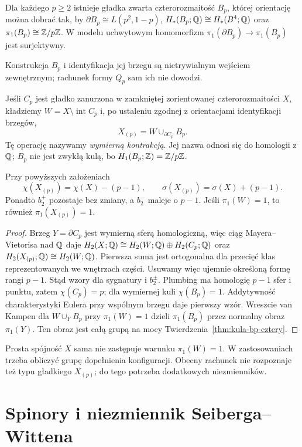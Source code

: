 \begin{twierdzenie}
\label{thm:kula-bp-cztery}
Dla każdego $p\geq2$ istnieje gładka zwarta
czterorozmaitość $B_p$, której orientację można
dobrać tak, by
$\partial B_p\cong L(p^2,1-p)$,
$H_*(B_p;\mathbb{Q})\cong H_*(B^4;\mathbb{Q})$ oraz
$\pi_1(B_p)\cong\mathbb{Z}/p\mathbb{Z}$.
W modelu uchwytowym homomorfizm
$\pi_1(\partial B_p)\to\pi_1(B_p)$ jest surjektywny.
\end{twierdzenie}
\noindent Konstrukcja $B_p$ i identyfikacja jej brzegu
są nietrywialnym wejściem zewnętrznym; rachunek formy
$Q_p$ sam ich nie dowodzi.

Jeśli $C_p$ jest gładko zanurzona w zamkniętej
zorientowanej czterorozmaitości $X$, kładziemy
$W=X\setminus\operatorname{int}C_p$ i, po ustaleniu
zgodnej z orientacjami identyfikacji brzegów,
\[
 X_{(p)}=W\cup_{\partial C_p}B_p.
\]
Tę operację nazywamy \emph{wymierną kontrakcją}.
Jej nazwa odnosi się do homologii z $\mathbb{Q}$;
$B_p$ nie jest zwykłą kulą, bo $H_1(B_p;\mathbb{Z})=\mathbb{Z}/p\mathbb{Z}$.

\begin{stwierdzenie}
\label{prop:kontrakcja-niezmienniki-cztery}
Przy powyższych założeniach
\[
 \chi(X_{(p)})=\chi(X)-(p-1),\qquad
 \sigma(X_{(p)})=\sigma(X)+(p-1).
\]
Ponadto $b_2^+$ pozostaje bez zmiany, a $b_2^-$
maleje o $p-1$. Jeśli $\pi_1(W)=1$, to również
$\pi_1(X_{(p)})=1$.
\end{stwierdzenie}
\begin{proof}
Brzeg $Y=\partial C_p$ jest wymierną sferą homologiczną,
więc ciąg Mayera--Vietorisa nad $\mathbb{Q}$ daje
$H_2(X;\mathbb{Q})\cong H_2(W;\mathbb{Q})\oplus H_2(C_p;\mathbb{Q})$
oraz $H_2(X_{(p)};\mathbb{Q})\cong H_2(W;\mathbb{Q})$.
Pierwsza suma jest ortogonalna dla przecięć klas
reprezentowanych we wnętrzach części. Usuwamy więc
ujemnie określoną formę rangi $p-1$.
Stąd wzory dla sygnatury i $b_2^\pm$.
Plumbing ma homologię $p-1$ sfer i punktu,
zatem $\chi(C_p)=p$; dla wymiernej kuli
$\chi(B_p)=1$. Addytywność charakterystyki Eulera
przy wspólnym brzegu daje pierwszy wzór.
Wreszcie van Kampen dla $W\cup_Y B_p$ przy
$\pi_1(W)=1$ dzieli $\pi_1(B_p)$ przez normalny
obraz $\pi_1(Y)$. Ten obraz jest całą grupą na mocy
Twierdzenia~\ref{thm:kula-bp-cztery}.
\end{proof}

Prosta spójność $X$ sama nie zastępuje warunku
$\pi_1(W)=1$. W zastosowaniach trzeba obliczyć
grupę dopełnienia konfiguracji. Obecny rachunek
nie rozpoznaje też typu gładkiego $X_{(p)}$;
do tego potrzeba dodatkowych niezmienników.

\section{Spinory i niezmiennik Seiberga--Wittena}
\label{sec:sw-wprowadzenie-cztery}

